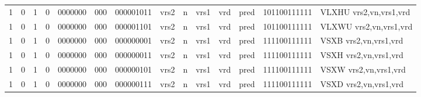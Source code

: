 \begin{landscape}
\begin{table}[p]
\begin{small}
\begin{center}
\begin{tabular}{p{0.08in}@{}p{0.08in}@{}p{0.08in}@{}p{0.08in}@{}p{0.50in}@{}p{0.30in}@{}p{0.08in}@{}p{0.8in}@{}p{0.48in}@{}p{0.32in}@{}p{0.08in}@{}p{0.8in}@{}p{0.8in}@{}p{0.4in}@{}p{0.56in}l}
\multicolumn{1}{|c|}{1} &
\multicolumn{1}{c|}{0} &
\multicolumn{1}{c|}{1} &
\multicolumn{1}{c|}{0} &
\multicolumn{1}{c|}{0000000} &
\multicolumn{1}{c|}{000} &
\multicolumn{2}{c|}{000001011} &
\multicolumn{2}{c|}{vrs2} &
\multicolumn{1}{c|}{n} &
\multicolumn{1}{c|}{vrs1} &
\multicolumn{1}{c|}{vrd} &
\multicolumn{1}{c|}{pred} &
\multicolumn{1}{c|}{101100111111} & VLXHU vrs2,vn,vrs1,vrd \\
\cline{1-15}
  

\multicolumn{1}{|c|}{1} &
\multicolumn{1}{c|}{0} &
\multicolumn{1}{c|}{1} &
\multicolumn{1}{c|}{0} &
\multicolumn{1}{c|}{0000000} &
\multicolumn{1}{c|}{000} &
\multicolumn{2}{c|}{000001101} &
\multicolumn{2}{c|}{vrs2} &
\multicolumn{1}{c|}{n} &
\multicolumn{1}{c|}{vrs1} &
\multicolumn{1}{c|}{vrd} &
\multicolumn{1}{c|}{pred} &
\multicolumn{1}{c|}{101100111111} & VLXWU vrs2,vn,vrs1,vrd \\
\cline{1-15}
  

\multicolumn{1}{|c|}{1} &
\multicolumn{1}{c|}{0} &
\multicolumn{1}{c|}{1} &
\multicolumn{1}{c|}{0} &
\multicolumn{1}{c|}{0000000} &
\multicolumn{1}{c|}{000} &
\multicolumn{2}{c|}{000000001} &
\multicolumn{2}{c|}{vrs2} &
\multicolumn{1}{c|}{n} &
\multicolumn{1}{c|}{vrs1} &
\multicolumn{1}{c|}{vrd} &
\multicolumn{1}{c|}{pred} &
\multicolumn{1}{c|}{111100111111} & VSXB vrs2,vn,vrs1,vrd \\
\cline{1-15}
  

\multicolumn{1}{|c|}{1} &
\multicolumn{1}{c|}{0} &
\multicolumn{1}{c|}{1} &
\multicolumn{1}{c|}{0} &
\multicolumn{1}{c|}{0000000} &
\multicolumn{1}{c|}{000} &
\multicolumn{2}{c|}{000000011} &
\multicolumn{2}{c|}{vrs2} &
\multicolumn{1}{c|}{n} &
\multicolumn{1}{c|}{vrs1} &
\multicolumn{1}{c|}{vrd} &
\multicolumn{1}{c|}{pred} &
\multicolumn{1}{c|}{111100111111} & VSXH vrs2,vn,vrs1,vrd \\
\cline{1-15}
  

\multicolumn{1}{|c|}{1} &
\multicolumn{1}{c|}{0} &
\multicolumn{1}{c|}{1} &
\multicolumn{1}{c|}{0} &
\multicolumn{1}{c|}{0000000} &
\multicolumn{1}{c|}{000} &
\multicolumn{2}{c|}{000000101} &
\multicolumn{2}{c|}{vrs2} &
\multicolumn{1}{c|}{n} &
\multicolumn{1}{c|}{vrs1} &
\multicolumn{1}{c|}{vrd} &
\multicolumn{1}{c|}{pred} &
\multicolumn{1}{c|}{111100111111} & VSXW vrs2,vn,vrs1,vrd \\
\cline{1-15}
  

\multicolumn{1}{|c|}{1} &
\multicolumn{1}{c|}{0} &
\multicolumn{1}{c|}{1} &
\multicolumn{1}{c|}{0} &
\multicolumn{1}{c|}{0000000} &
\multicolumn{1}{c|}{000} &
\multicolumn{2}{c|}{000000111} &
\multicolumn{2}{c|}{vrs2} &
\multicolumn{1}{c|}{n} &
\multicolumn{1}{c|}{vrs1} &
\multicolumn{1}{c|}{vrd} &
\multicolumn{1}{c|}{pred} &
\multicolumn{1}{c|}{111100111111} & VSXD vrs2,vn,vrs1,vrd \\
\cline{1-15}
  


\end{tabular}
\end{center}
\end{small}
\end{table}
\end{landscape}
